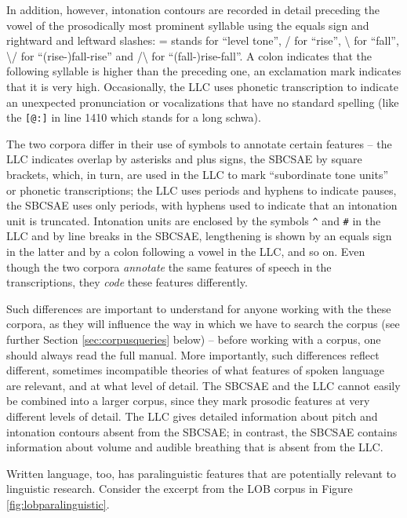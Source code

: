 In addition, however, intonation contours are recorded in detail preceding the vowel of the prosodically most prominent syllable using the equals sign and rightward and leftward slashes: = stands for ``level tone'', / for ``rise'', \textbackslash{} for ``fall'', \textbackslash{}/ for ``(rise-)fall-rise'' and /\textbackslash{} for ``(fall-)rise-fall''.  A colon indicates that the following syllable is higher than the preceding one, an exclamation mark indicates that it is very high. Occasionally, the LLC uses phonetic transcription to indicate an unexpected pronunciation or vocalizations that have no standard spelling (like the \texttt{[@:]} in line 1410 which stands for a long schwa).

The two corpora differ in their use of symbols to annotate certain features -- the LLC indicates overlap by asterisks and plus signs, the SBCSAE by square brackets, which, in turn, are used in the LLC to mark ``subordinate tone units'' or phonetic transcriptions; the LLC uses periods and hyphens to indicate pauses, the SBCSAE uses only periods, with hyphens used to indicate that an intonation unit is truncated. Intonation units are enclosed by the symbols \texttt{\^{}} and \texttt{\#} in the LLC and by line breaks in the SBCSAE, lengthening is shown by an equals sign in the latter and by a colon following a vowel in the LLC, and so on. Even though the two corpora \emph{annotate} the same features of speech in the transcriptions, they \emph{code} these features differently.

Such differences are important to understand for anyone working with the these corpora, as they will influence the way in which we have to search the corpus (see further Section \ref{sec:corpusqueries} below) -- before working with a corpus, one should always read the full manual. More importantly, such differences reflect different, sometimes incompatible theories of what features of spoken language are relevant, and at what level of detail. The SBCSAE and the LLC cannot easily be combined into a larger corpus, since they mark prosodic features at very different levels of detail. The LLC gives detailed information about pitch and intonation contours absent from the SBCSAE; in contrast, the SBCSAE contains information about volume and audible breathing that is absent from the LLC.

Written language, too, has paralinguistic features that are potentially relevant to linguistic research. Consider the excerpt from the LOB corpus in Figure \ref{fig:lobparalinguistic}.

